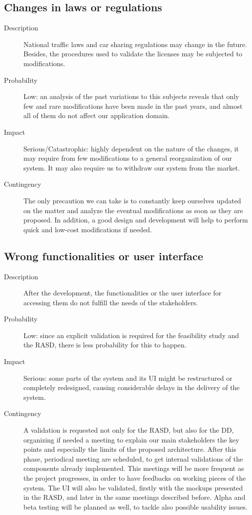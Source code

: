 \subsection*{Changes in laws or regulations}
	\begin{description}
		\item[Description] National traffic laws and car sharing regulations may change in the future. Besides, the procedures used to validate the licenses may be subjected to modifications.
		\item[Probability] Low: an analysis of the past variations to this subjects reveals that only few and rare modifications have been made in the past years, and almost all of them do not affect our application domain.
		\item[Impact] Serious/Catastrophic: highly dependent on the nature of the changes, it may require from few modifications to a general reorganization of our system. It may also require us to withdraw our system from the market.
		\item[Contingency] The only precaution we can take is to constantly keep ourselves updated on the matter and analyze the eventual modifications as soon as they are proposed. In addition, a good design and development will help to perform quick and low-cost modifications if needed.
	\end{description}

\subsection*{Wrong functionalities or user interface}
	\begin{description}
		\item[Description] After the development, the functionalities or the user interface for accessing them do not fulfill the needs of the stakeholders.
		\item[Probability] Low: since an explicit validation is required for the feasibility study and the RASD, there is less probability for this to happen.
		\item[Impact] Serious: some parts of the system and its UI might be restructured or completely redesigned, causing considerable delays in the delivery of the system.
		\item[Contingency] A validation is requested not only for the RASD, but also for the DD, organizing if needed a meeting to explain our main stakeholders the key points and especially the limits of the proposed architecture. After this phase, periodical meeting are scheduled, to get internal validations of the components already implemented. This meetings will be more frequent as the project progresses, in order to have feedbacks on working pieces of the system.\newline
		The UI will also be validated, firstly with the mockups presented in the RASD, and later in the same meetings described before.\newline
		Alpha and beta testing will be planned as well, to tackle also possible usability issues.
	\end{description}

